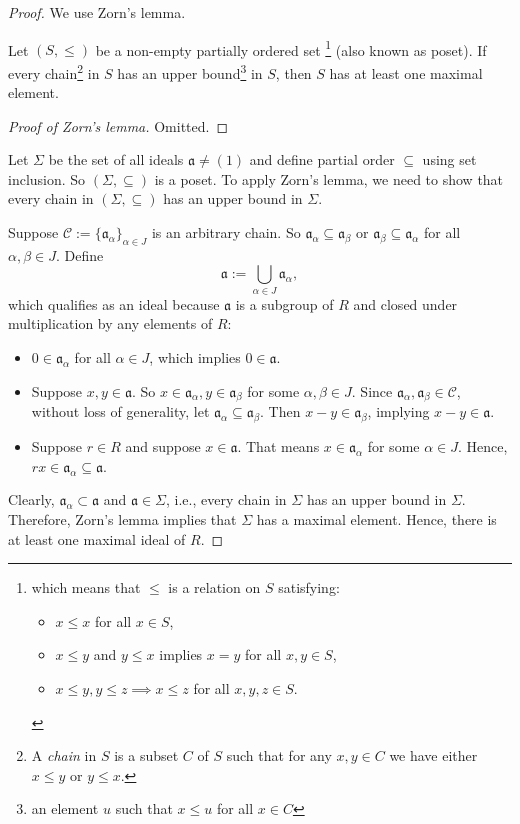 \begin{proof}
    We use Zorn's lemma.
    \begin{theorem}
    Let \((S, \le)\) be a non-empty partially ordered set
        \footnote{which means that \(\le\) is a relation on \(S\) satisfying:               \begin{itemize}
                \item \(x \le x\) for all \(x \in S\), 
                \item \(x \le y\) and \(y \le x\) implies \(x = y\) for all \(x, y \in S\),
                \item \(x \le y, y \le z \implies x \le z\) for all \(x, y, z \in S\).
            \end{itemize}
        } (also known as poset). 
        If every chain\footnote{A \textit{chain} in \(S\) is a subset \(C\) of \(S\) such that for any \(x, y \in C\) we have either \(x \le y\) or \(y \le x\).} in \(S\) has an upper bound\footnote{an element \(u\) such that \(x \le u\) for all \(x \in C\)} in \(S\), then \(S\) has at least one maximal element.
    \end{theorem}
    \begin{proof}[Proof of Zorn's lemma]Omitted.\end{proof}
    Let \(\Sigma\) be the set of all ideals \(\mathfrak{a} \neq (1)\) and define partial order \(\subseteq\) using set inclusion. So \((\Sigma, \subseteq)\) is a poset. To apply Zorn's lemma, we need to show that every chain in \((\Sigma, \subseteq)\) has an upper bound in \(\Sigma\).

    Suppose \(\mathcal{C}:= \{\mathfrak{a}_\alpha\}_{\alpha \in J}\) is an arbitrary chain. So \(\mathfrak{a}_\alpha \subseteq \mathfrak{a}_\beta\) or \(\mathfrak{a}_\beta \subseteq \mathfrak{a}_\alpha\) for all \(\alpha, \beta \in J\). Define \[\mathfrak{a} := \bigcup_{\alpha \in J} \mathfrak{a}_\alpha,\] which qualifies as an ideal because \(\mathfrak{a}\) is a subgroup of \(R\) and closed under multiplication by any elements of \(R\):
    \begin{itemize}
        \item \(0 \in \mathfrak{a}_\alpha\) for all \(\alpha \in J\), which implies \(0 \in \mathfrak{a}\).
        \item Suppose \(x, y \in \mathfrak{a}\). So \(x \in \mathfrak{a}_\alpha, y \in \mathfrak{a}_\beta\) for some \(\alpha, \beta \in J\). Since \(\mathfrak{a}_\alpha, \mathfrak{a}_\beta \in \mathcal{C}\), without loss of generality, let \(\mathfrak{a}_\alpha \subseteq \mathfrak{a}_\beta\). Then \(x - y \in \mathfrak{a}_\beta\), implying \(x - y \in \mathfrak{a}\).
        \item Suppose \(r \in R\) and suppose \(x \in \mathfrak{a}\). That means \(x \in \mathfrak{a}_\alpha\) for some \(\alpha \in J\). Hence, \(rx \in \mathfrak{a}_\alpha \subseteq \mathfrak{a}\). 
    \end{itemize}
    Clearly, \(\mathfrak{a}_\alpha \subset \mathfrak{a}\) and \(\mathfrak{a} \in \Sigma\), i.e., every chain in \(\Sigma\) has an upper bound in \(\Sigma\). Therefore, Zorn's lemma implies that \(\Sigma\) has a maximal element. Hence, there is at least one maximal ideal of \(R\).
\end{proof}
